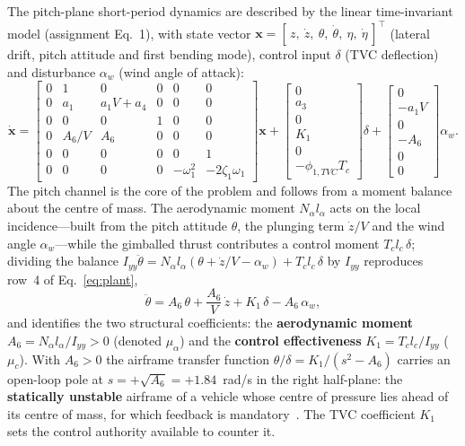 \documentclass[../main.tex]{subfiles}
\begin{document}
The pitch-plane short-period dynamics are described by the linear
time-invariant model (assignment Eq.~1), with state vector
$\mathbf{x} = [\,z,\ \dot z,\ \theta,\ \dot\theta,\ \eta,\ \dot\eta\,]^\top$
(lateral drift, pitch attitude and first bending mode), control input $\delta$
(TVC deflection) and disturbance $\alpha_w$ (wind angle of attack):
\begin{equation}
\dot{\mathbf{x}} =
\begin{bmatrix}
0 & 1 & 0 & 0 & 0 & 0\\
0 & a_1 & a_1 V + a_4 & 0 & 0 & 0\\
0 & 0 & 0 & 1 & 0 & 0\\
0 & A_6/V & A_6 & 0 & 0 & 0\\
0 & 0 & 0 & 0 & 0 & 1\\
0 & 0 & 0 & 0 & -\omega_1^2 & -2\zeta_1\omega_1
\end{bmatrix}\mathbf{x}
+
\begin{bmatrix} 0\\ a_3\\ 0\\ K_1\\ 0\\ -\phi_{1,TVC}T_c \end{bmatrix}\delta
+
\begin{bmatrix} 0\\ -a_1 V\\ 0\\ -A_6\\ 0\\ 0 \end{bmatrix}\alpha_w .
\label{eq:plant}
\end{equation}
The pitch channel is the core of the problem and follows from a moment balance
about the centre of mass. The aerodynamic moment $N_\alpha l_\alpha$ acts on the
local incidence---built from the pitch attitude $\theta$, the plunging term
$\dot z/V$ and the wind angle $\alpha_w$---while the gimballed thrust contributes
a control moment $T_c l_c\,\delta$; dividing the balance
$I_{yy}\ddot\theta = N_\alpha l_\alpha(\theta + \dot z/V - \alpha_w) + T_c l_c\,\delta$
by $I_{yy}$ reproduces row~4 of Eq.~\eqref{eq:plant},
\begin{equation}
\ddot\theta = A_6\,\theta + \frac{A_6}{V}\,\dot z + K_1\,\delta - A_6\,\alpha_w ,
\label{eq:pitch_channel}
\end{equation}
and identifies the two structural coefficients: the \textbf{aerodynamic moment}
$A_6 = N_\alpha l_\alpha / I_{yy} > 0$ (denoted $\mu_\alpha$) and the
\textbf{control effectiveness} $K_1 = T_c l_c / I_{yy}$ ($\mu_c$). With $A_6 > 0$
the airframe transfer function $\theta/\delta = K_1/(s^2 - A_6)$ carries an
open-loop pole at $s = +\sqrt{A_6} = +1.84$~rad/s in the right half-plane: the
\textbf{statically unstable} airframe of a vehicle whose centre of pressure lies
ahead of its centre of mass, for which feedback is
mandatory~\cite[Lecture~15]{dclvnotes}. The TVC coefficient $K_1$
sets the control authority available to counter it.
\end{document}
